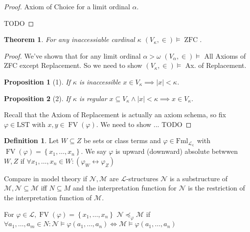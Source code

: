 \documentclass{scrartcl}
\renewcommand{\L}{\mathcal{L}}
\newcommand{\Le}{\L_\in}
\newcommand{\set}[1]{\left\{#1\right\}}
\DeclareMathOperator{\ZFC}{ZFC}
\DeclareMathOperator{\FV}{FV}
\theoremstyle{definition}
\newtheorem*{definition*}{Definition}
\theoremstyle{plain}
\newtheorem*{proposition*}{Proposition}
\newtheorem*{theorem*}{Theorem}
\theoremstyle{remark}
\begin{document}
	\begin{proof}
		Axiom of Choice for a limit ordinal $\alpha$.
		
		TODO
		
	\end{proof}

	\begin{theorem*}
		For any inaccessiable cardinal $\kappa$ $(V_\kappa, \in) \vDash \ZFC$.
	\end{theorem*}

	\begin{proof}
		We've shown that for any limit ordinal $\alpha > \omega$ $(V_\alpha, \in) \vDash $ All Axioms of ZFC except Replacement. So we need to show $(V_\kappa, \in) \vDash $ Ax. of Replacement.
	
	
		\begin{proposition*}[1]
			If $\kappa$ is inaccessible $x \in V_\kappa \implies |x| < \kappa$.
		\end{proposition*}
		
		\begin{proposition*}[2]
			If $\kappa$ is regular $x \subseteq V_\kappa \land |x| < \kappa \implies x \in V_\kappa$.
		\end{proposition*}
		
		Recall that the Axiom of Replacement is actually an axiom schema, so fix $\varphi \in \text{LST}$ with $x, y\in \FV(\varphi)$. We need to show ... TODO
	\end{proof}

	\begin{definition*}
		Let $W \subseteq Z$ be sets or class terms and $\varphi \in \text{Fml}_{\Le}$ with $\FV(\varphi) = \set{x_1, \dots, x_n}$. We say $\varphi$ is upward (downward) absolute betwwen $W, Z$ if 
		$\forall x_1, \dots, x_n \in W: (\varphi_W \longleftrightarrow \varphi_Z)$ 
	\end{definition*}
	
	Compare in model theory if $\mathcal{N}, \mathcal{M}$ are $\L$-structures $\mathcal{N}$ is a substructure of $\mathcal{M}, \mathcal{N} \subseteq \mathcal{M}$ iff $N \subseteq M$ and the interpretation function for $\mathcal{N}$ is the restriction of the interpretation function of $\mathcal{M}$.
	
	For $\varphi \in \L, \FV(\varphi) = \set{x_1, \dots, x_n}$ $\mathcal{N} \preceq_\varphi \mathcal{M}$ if $\forall a_1, \dots, a_m \in N: \mathcal{N} \vDash \varphi(a_1, \dots, a_n) \iff \mathcal{M} \vDash \varphi(a_1, \dots, a_n)$
	
\end{document}

